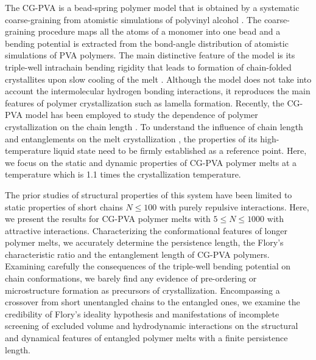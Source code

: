 \documentclass[pre,showpacs,notitlepage,twocolumn]{revtex4-1}
\begin{document}
  The  CG-PVA  is a  bead-spring polymer model  that  is obtained by a systematic coarse-graining from atomistic simulations of
  polyvinyl alcohol \cite{Reith}.  The coarse-graining procedure maps all the atoms of a monomer into one bead and a bending potential is extracted from the bond-angle distribution of atomistic simulations of PVA polymers.  The main distinctive feature of the model is its triple-well  intrachain bending rigidity  that leads to formation of chain-folded crystallites upon slow cooling of the melt \cite{Meyer2001,SaraMacro}. Although the model does not take into account the intermolecular hydrogen bonding interactions, it reproduces the main features of polymer crystallization  such as lamella formation.  Recently, the CG-PVA  model has been employed to study the dependence of polymer crystallization on the chain length \cite{SaraPRL2017,Joerg2016}.
  To understand the influence  of chain length  and entanglements on the  melt crystallization \cite{Luo2013,Luo2016}, the  properties of its high-temperature liquid state need to be firmly established as a reference point. Here, we focus on the static and dynamic properties of CG-PVA polymer melts  at a temperature which is 1.1 times the crystallization temperature. 
  
  
  The prior studies of structural properties  of  this system  have been limited to static properties of short chains  $N \le 100$ \cite{Vettorel2007}  with purely repulsive interactions.  Here, we  present the results for CG-PVA  polymer melts with $5 \le N \le 1000$  with attractive interactions.  
  Characterizing the  conformational features of longer polymer melts, we  accurately determine the persistence length, the Flory's characteristic ratio and  the entanglement  length of   CG-PVA polymers. Examining carefully the consequences of  the triple-well  bending potential on  chain  conformations, we   barely find any evidence of pre-ordering or microstructure formation as precursors of crystallization. 
  Encompassing  a crossover from short unentangled chains to  the entangled ones,  we examine  the   credibility of Flory's ideality hypothesis and manifestations of incomplete screening of excluded volume and hydrodynamic interactions on the structural and dynamical features of entangled polymer melts with a finite persistence length.
 
\end{document}
